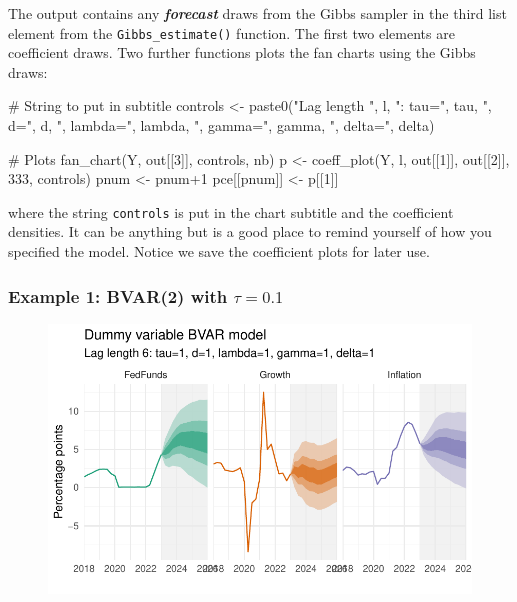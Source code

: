 \documentclass[
  letterpaper,
]{book}
\newenvironment{Shaded}{\begin{snugshade}}{\end{snugshade}}
\newcommand{\CommentTok}[1]{\textcolor[rgb]{0.37,0.37,0.37}{#1}}
\newcommand{\DecValTok}[1]{\textcolor[rgb]{0.68,0.00,0.00}{#1}}
\newcommand{\FunctionTok}[1]{\textcolor[rgb]{0.28,0.35,0.67}{#1}}
\newcommand{\NormalTok}[1]{\textcolor[rgb]{0.00,0.23,0.31}{#1}}
\newcommand{\OtherTok}[1]{\textcolor[rgb]{0.00,0.23,0.31}{#1}}
\newcommand{\SpecialCharTok}[1]{\textcolor[rgb]{0.37,0.37,0.37}{#1}}
\newcommand{\StringTok}[1]{\textcolor[rgb]{0.13,0.47,0.30}{#1}}
\begin{document}
The output contains any \textbf{\emph{forecast}} draws from the Gibbs
sampler in the third list element from the \texttt{Gibbs\_estimate()}
function. The first two elements are coefficient draws. Two further
functions plots the fan charts using the Gibbs draws:

\begin{Shaded}
\begin{Highlighting}[]
\CommentTok{\# String to put in subtitle}
\NormalTok{controls }\OtherTok{\textless{}{-}} \FunctionTok{paste0}\NormalTok{(}\StringTok{"Lag length "}\NormalTok{, l, }\StringTok{": tau="}\NormalTok{, tau, }\StringTok{", d="}\NormalTok{, d,}
                   \StringTok{", lambda="}\NormalTok{, lambda, }\StringTok{", gamma="}\NormalTok{, gamma, }\StringTok{", delta="}\NormalTok{, delta)}

\CommentTok{\# Plots}
\FunctionTok{fan\_chart}\NormalTok{(Y, out[[}\DecValTok{3}\NormalTok{]], controls, nb)}
\NormalTok{p           }\OtherTok{\textless{}{-}} \FunctionTok{coeff\_plot}\NormalTok{(Y, l, out[[}\DecValTok{1}\NormalTok{]], out[[}\DecValTok{2}\NormalTok{]], }\DecValTok{333}\NormalTok{, controls)}
\NormalTok{pnum        }\OtherTok{\textless{}{-}}\NormalTok{ pnum}\SpecialCharTok{+}\DecValTok{1}
\NormalTok{pce[[pnum]] }\OtherTok{\textless{}{-}}\NormalTok{ p[[}\DecValTok{1}\NormalTok{]]}
\end{Highlighting}
\end{Shaded}

where the string \texttt{controls} is put in the chart subtitle and the
coefficient densities. It can be anything but is a good place to remind
yourself of how you specified the model. Notice we save the coefficient
plots for later use.

\hypertarget{example-1-bvar2-with-tau0.1}{%
\subsubsection{\texorpdfstring{Example 1: BVAR(2) with
\(\tau=0.1\)}{Example 1: BVAR(2) with \textbackslash tau=0.1}}\label{example-1-bvar2-with-tau0.1}}

\begin{figure}

{\centering \includegraphics{./BVAR_files/figure-pdf/estim-1.pdf}

}

\end{figure}
\end{document}
